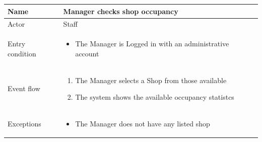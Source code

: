 \begin{table}[H]
    \begin{tabu} to \textwidth {|X|X[4]|}
        \hline
        Name            & Manager checks shop occupancy \\ \hline
        Actor           & Staff                         \\ \hline
        Entry condition & \begin{itemize}
            \item The Manager is Logged in with an administrative account
        \end{itemize}    \\ \hline
        Event flow      & \begin{enumerate}
            \item The Manager selects a Shop from those available
            \item The system shows the available occupancy statistcs
        \end{enumerate}    \\ \hline
        Exceptions      & \begin{itemize}
            \item The Manager does not have any listed shop
        \end{itemize}    \\ \hline
    \end{tabu}
\end{table}

